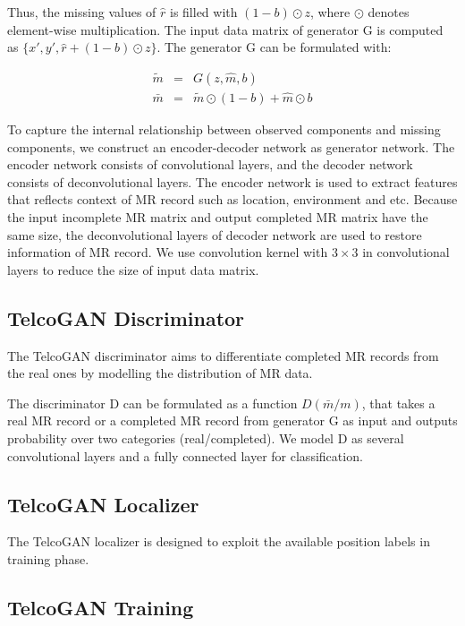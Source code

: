 Thus, the missing values of $\hat{r}$ is filled with $(1-b)\odot z$, where $\odot$ denotes element-wise multiplication. The input data matrix of generator G is computed as $\{x', y', \hat{r}+(1-b)\odot z\}$. The generator G can be formulated with:

\begin{eqnarray}
  \tilde{m} &=& G(z, \hat{m}, b) \\
  \bar{m}   &=& \tilde{m}\odot (1-b) + \hat{m}\odot b
\end{eqnarray}

To capture the internal relationship between observed components and missing components, we construct an encoder-decoder network as generator network. The encoder network consists of convolutional layers, and the decoder network consists of deconvolutional layers. The encoder network is used to extract features that reflects context of MR record such as location, environment and etc. Because the input incomplete MR matrix and output completed MR matrix have the same size, the deconvolutional layers of decoder network are used to restore information of MR record. We use convolution kernel with $3\times 3$ in convolutional layers to reduce the size of input data matrix.

\subsection{TelcoGAN Discriminator}
The TelcoGAN discriminator aims to differentiate completed MR records from the real ones by modelling the distribution of MR data.

The discriminator D can be formulated as a function $D(\bar{m}/m)$, that takes a real MR record or a completed MR record from generator G as input and outputs probability over two categories (real/completed). We model D as several convolutional layers and a fully connected layer for classification.

\subsection{TelcoGAN Localizer}
The TelcoGAN localizer is designed to exploit the available position labels in training phase.

\subsection{TelcoGAN Training}
